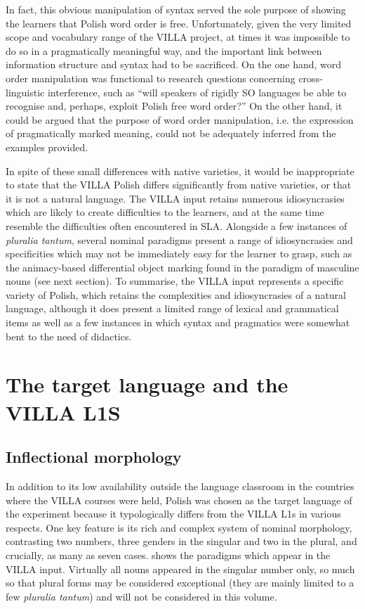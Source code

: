 In fact, this obvious manipulation of syntax served the sole purpose of showing the learners that Polish word order is free. Unfortunately, given the very limited scope and vocabulary range of the VILLA project, at times it was impossible to do so in a pragmatically meaningful way, and the important link between information structure and syntax had to be sacrificed. On the one hand, word order manipulation was functional to research questions concerning cross-linguistic interference, such as “will speakers of rigidly SO languages be able to recognise and, perhaps, exploit Polish free word order?” On the other hand, it could be argued that the purpose of word order manipulation, i.e. the expression of pragmatically marked meaning, could not be adequately inferred from the examples provided. 

In spite of these small differences with native varieties, it would be inappropriate to state that the VILLA Polish differs significantly from native varieties, or that it is not a natural language. The VILLA input retains numerous idiosyncrasies which are likely to create difficulties to the learners, and at the same time resemble the difficulties often encountered in SLA. Alongside a few instances of \textit{pluralia tantum}, several nominal paradigms present a range of idiosyncrasies and specificities which may not be immediately easy for the learner to grasp, such as the animacy-based differential object marking found in the paradigm of masculine nouns (see next section). To summarise, the VILLA input represents a specific variety of Polish, which retains the complexities and idiosyncrasies of a natural language, although it does present a limited range of lexical and grammatical items as well as a few instances in which syntax and pragmatics were somewhat bent to the need of didactics.

\section{The target language and the VILLA L1S}\label{sec:02:2}
\subsection{Inflectional morphology}\label{sec:02:2.1}

In addition to its low availability outside the language classroom in the countries where the VILLA courses were held, Polish was chosen as the target language of the experiment because it typologically differs from the VILLA L1s in various respects. One key feature is its rich and complex system of nominal morphology, contrasting two numbers, three genders in the singular and two in the plural, and crucially, as many as seven cases.  shows the paradigms which appear in the VILLA input. Virtually all nouns appeared in the singular number only, so much so that plural forms may be considered exceptional (they are mainly limited to a few \textit{pluralia tantum}) and will not be considered in this volume.

